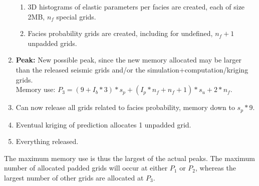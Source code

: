 \begin{enumerate}
\begin{enumerate}
\item 3D histograms of elastic parameters per facies are created, each of size 2MB, $n_f$ special grids.
\item Facies probability grids are created, including for undefined, $n_f+1$ unpadded grids.
\end{enumerate}
\item {\bf Peak:} New possible peak, since the new memory allocated may be larger than the released seismic grids and/or the simulation+computation/kriging grids. \\
    Memory use: $P_3 = (9+I_b*3)*s_p+(I_p*n_f + n_f +1)*s_u + 2*n_f$.
\item Can now release all grids related to facies probability, memory down to $s_p*9$.
\item Eventual kriging of prediction allocates 1 unpadded grid.
\item Everything released.
\end{enumerate}

The maximum memory use is thus the largest of the actual peaks. The maximum number of allocated padded grids will occur at either $P_1$ or $P_2$, whereas the largest number of other grids are allocated at $P_3$. 
